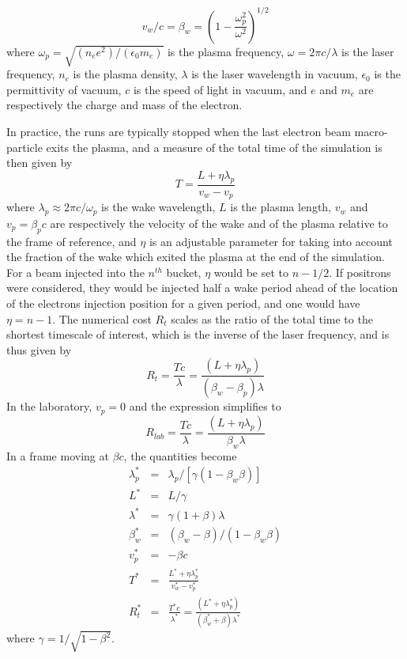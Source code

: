 %
\begin{equation}
v_w/c=\beta_w=\left(1-\frac{\omega_p^2}{\omega^2}\right)^{1/2}
\end{equation}
%
where $\omega_p=\sqrt{(n_e e^2)/(\epsilon_0 m_e)}$ is the plasma frequency, $\omega=2\pi c/\lambda$ is the laser frequency, $n_e$ is the plasma density, $\lambda$ is the laser wavelength in vacuum, $\epsilon_0$ is the permittivity of vacuum, $c$ is the speed of light in vacuum, and $e$ and $m_e$ are respectively the charge and mass of the electron.

In practice, the runs are typically stopped when the last electron beam macro-particle exits the plasma, and a measure of the total time of the simulation is then given by
%
\begin{equation}
T=\frac{L+\eta \lambda_p}{v_w-v_p}
\end{equation}
%
where $\lambda_p\approx 2\pi c/\omega_p$ is the wake wavelength, $L$ is the plasma length, $v_w$ and $v_p=\beta_p c$ are respectively the velocity of the wake and of the plasma relative to the frame of reference, and $\eta$ is an adjustable parameter for taking into account the fraction of the wake which exited the plasma at the end of the simulation.
For a beam injected into the $n^{th}$ bucket, $\eta$ would be set to $n-1/2$. If positrons were considered, they would be injected half a wake period ahead of the location of the electrons injection position for a given period, and one would have $\eta=n-1$. The numerical cost $R_t$ scales as the ratio of the total time to the shortest timescale of interest, which is the inverse of the laser frequency, and is thus given by
%
\begin{equation}
R_t=\frac{T c}{\lambda}=\frac{\left(L+\eta \lambda_p\right)}{\left(\beta_w-\beta_p\right) \lambda}
\end{equation}
%
In the laboratory, $v_p=0$ and the expression simplifies to
%
\begin{equation}
R_{lab}=\frac{T c}{\lambda}=\frac{\left(L+\eta \lambda_p\right)}{\beta_w \lambda}
\end{equation}
%
In a frame moving at $\beta c$, the quantities become
\begin{eqnarray}
\lambda_p^*&=&\lambda_p/\left[\gamma \left(1-\beta_w \beta\right)\right] \\
L^*&=&L/\gamma \\
\lambda^*&=& \gamma\left(1+\beta\right) \lambda\\
\beta_w^*&=&\left(\beta_w-\beta\right)/\left(1-\beta_w\beta\right) \\
v_p^*&=&-\beta c \\
T^*&=&\frac{L^*+\eta \lambda_p^*}{v_w^*-v_p^*} \\
R_t^*&=&\frac{T^* c}{\lambda^*} = \frac{\left(L^*+\eta \lambda_p^*\right)}{\left(\beta_w^*+\beta\right) \lambda^*}
\end{eqnarray}
where $\gamma=1/\sqrt{1-\beta^2}$.

